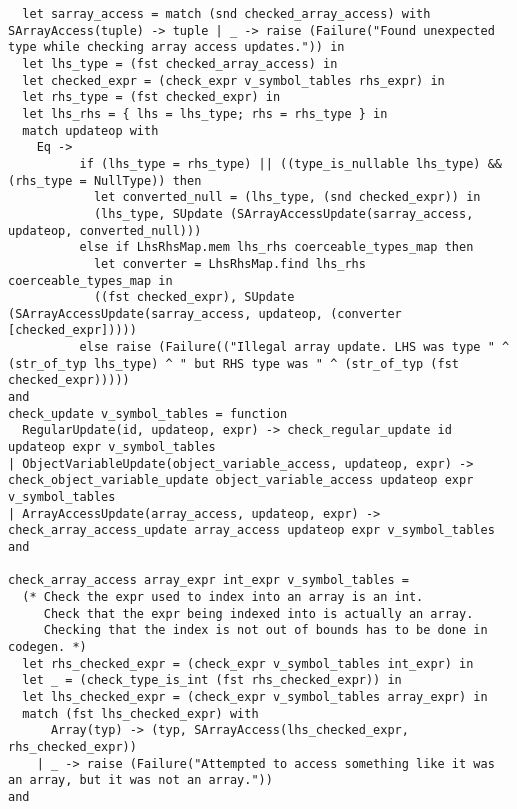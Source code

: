 \documentclass{article}
\begin{document}
\begin{verbatim}
  let sarray_access = match (snd checked_array_access) with SArrayAccess(tuple) -> tuple | _ -> raise (Failure("Found unexpected type while checking array access updates.")) in
  let lhs_type = (fst checked_array_access) in
  let checked_expr = (check_expr v_symbol_tables rhs_expr) in
  let rhs_type = (fst checked_expr) in
  let lhs_rhs = { lhs = lhs_type; rhs = rhs_type } in
  match updateop with
    Eq ->
          if (lhs_type = rhs_type) || ((type_is_nullable lhs_type) && (rhs_type = NullType)) then
            let converted_null = (lhs_type, (snd checked_expr)) in
            (lhs_type, SUpdate (SArrayAccessUpdate(sarray_access, updateop, converted_null)))
          else if LhsRhsMap.mem lhs_rhs coerceable_types_map then
            let converter = LhsRhsMap.find lhs_rhs coerceable_types_map in
            ((fst checked_expr), SUpdate (SArrayAccessUpdate(sarray_access, updateop, (converter [checked_expr]))))
          else raise (Failure(("Illegal array update. LHS was type " ^ (str_of_typ lhs_type) ^ " but RHS type was " ^ (str_of_typ (fst checked_expr)))))
and
check_update v_symbol_tables = function
  RegularUpdate(id, updateop, expr) -> check_regular_update id updateop expr v_symbol_tables
| ObjectVariableUpdate(object_variable_access, updateop, expr) -> check_object_variable_update object_variable_access updateop expr v_symbol_tables
| ArrayAccessUpdate(array_access, updateop, expr) -> check_array_access_update array_access updateop expr v_symbol_tables
and

check_array_access array_expr int_expr v_symbol_tables =
  (* Check the expr used to index into an array is an int.
     Check that the expr being indexed into is actually an array.
     Checking that the index is not out of bounds has to be done in codegen. *)
  let rhs_checked_expr = (check_expr v_symbol_tables int_expr) in
  let _ = (check_type_is_int (fst rhs_checked_expr)) in
  let lhs_checked_expr = (check_expr v_symbol_tables array_expr) in
  match (fst lhs_checked_expr) with
      Array(typ) -> (typ, SArrayAccess(lhs_checked_expr, rhs_checked_expr))
    | _ -> raise (Failure("Attempted to access something like it was an array, but it was not an array."))
and


\end{verbatim}
\end{document}
